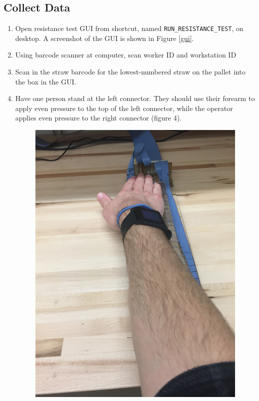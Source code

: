 \documentclass[letterpaper,12pt]{article}
\begin{document}
\subsection{Collect Data}
\begin{enumerate}
	\item Open resistance test GUI from shortcut, named \verb|RUN_RESISTANCE_TEST|, on desktop. A screenshot of the GUI is shown in Figure \ref{gui}.
	\item Using barcode scanner at computer, scan worker ID and workstation ID
	\item Scan in the straw barcode for the lowest-numbered straw on the pallet into the box in the GUI.
	\item Have one person stand at the left connector. They should use their forearm to apply even pressure to the top of the left connector, while the operator applies even pressure to the right connector (figure 4).
	\begin{figure}[h]
		\centering
		\includegraphics[scale=0.075 , angle=270]{closed_right_pressure}

\end{figure}
\end{enumerate}
\end{document}
